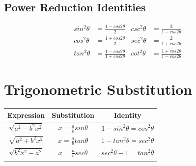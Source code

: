 \documentclass[12pt, letterpaper]{article}
\begin{document}
\subsection{Power Reduction Identities}
\begin{align*}
  sin^2\theta &= \frac{1-cos2\theta}{2}&
    csc^2\theta &= \frac{2}{1-cos2\theta}\\
  cos^2\theta &= \frac{1+cos2\theta}{2}&
    sec^2\theta &= \frac{2}{1+cos2\theta}\\
  tan^2\theta &= \frac{1-cos2\theta}{1+cos2\theta}&
    cot^2\theta &= \frac{1+cos2\theta}{1-cos2\theta}
\end{align*}

\section{Trigonometric Substitution}
\begin{center}
\begin{tabular}{c c c}
Expression & Substitution & Identity\\
\hline
$\sqrt{a^2 - b^2 x^2}$ & $x = \frac{a}{b} sin\theta$ & $1-sin^2 \theta = cos^2 \theta$\\
$\sqrt{a^2 + b^2 x^2}$ & $x = \frac{a}{b} tan\theta$ & $1-tan^2\theta = sec^2\theta$\\
$\sqrt{b^2 x^2 - a^2}$ & $x = \frac{a}{b} sec\theta$ & $sec^2\theta - 1 = tan^2 \theta$\\
\\
\end{tabular}
\end{center}
\end{document}
